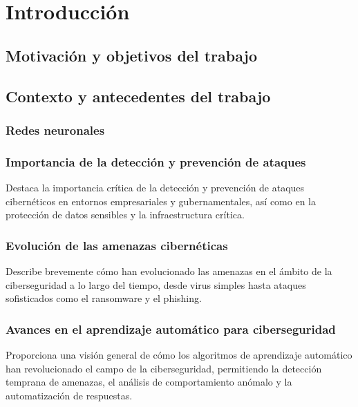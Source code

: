 \chapter{Introducción} \label{Capitulo 1}
      



\section{Motivación y objetivos del trabajo} \label{Sec:1_1}

    
\section{Contexto y antecedentes del trabajo} \label{Sec:1_2}

\subsection{Redes neuronales} \label{Subsubsec: 1_2_1}
  
\subsection{Importancia de la detección y prevención de ataques} \label{Subsec: 1_2_2}

Destaca la importancia crítica de la detección y prevención de ataques cibernéticos en entornos empresariales y gubernamentales, así como en la protección de datos sensibles y la infraestructura crítica.

\subsection{Evolución de las amenazas cibernéticas} \label{Subsec: 1_2_3}

Describe brevemente cómo han evolucionado las amenazas en el ámbito de la ciberseguridad a lo largo del tiempo, desde virus simples hasta ataques sofisticados como el ransomware y el phishing.

\subsection{Avances en el aprendizaje automático para ciberseguridad} \label{Subsubsec: 1_2_4}

Proporciona una visión general de cómo los algoritmos de aprendizaje automático han revolucionado el campo de la ciberseguridad, permitiendo la detección temprana de amenazas, el análisis de comportamiento anómalo y la automatización de respuestas.

